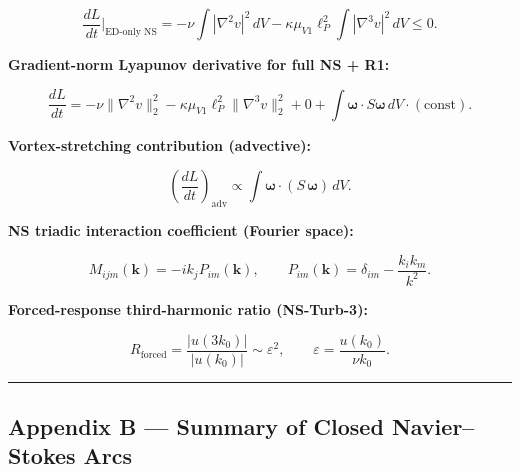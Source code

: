 \documentclass[
]{article}
\begin{document}
\[\frac{dL}{dt}\bigg|_\text{ED-only NS} = -\nu \int |\nabla^2 v|^2 \, dV - \kappa \mu_{V1} \ell_P^2 \int |\nabla^3 v|^2 \, dV \le 0.\]

\textbf{Gradient-norm Lyapunov derivative for full NS + R1:}

\[\frac{dL}{dt} = -\nu\|\nabla^2 v\|_2^2 - \kappa\mu_{V1}\ell_P^2 \|\nabla^3 v\|_2^2 + 0 + \int \boldsymbol{\omega} \cdot S\boldsymbol{\omega} \, dV \cdot (\mathrm{const}).\]

\textbf{Vortex-stretching contribution (advective):}

\[\left(\frac{dL}{dt}\right)_\mathrm{adv} \propto \int \boldsymbol{\omega} \cdot (S\,\boldsymbol{\omega}) \, dV.\]

\textbf{NS triadic interaction coefficient (Fourier space):}

\[M_{ijm}(\mathbf{k}) = -i k_j P_{im}(\mathbf{k}), \qquad P_{im}(\mathbf{k}) = \delta_{im} - \frac{k_i k_m}{k^2}.\]

\textbf{Forced-response third-harmonic ratio (NS-Turb-3):}

\[R_\mathrm{forced} = \frac{|u(3k_0)|}{|u(k_0)|} \sim \varepsilon^2, \qquad \varepsilon = \frac{u(k_0)}{\nu k_0}.\]

\begin{center}\rule{0.5\linewidth}{0.5pt}\end{center}

\subsection{Appendix B --- Summary of Closed Navier--Stokes
Arcs}\label{appendix-b-summary-of-closed-navierstokes-arcs}
\end{document}
